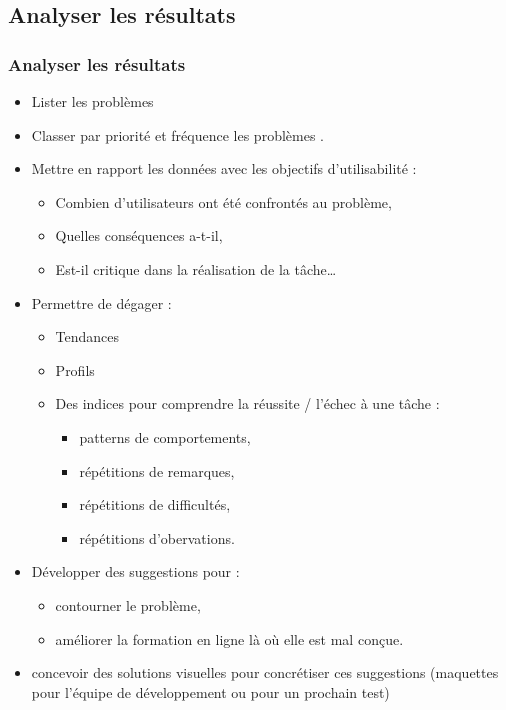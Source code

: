 	\subsection{Analyser les résultats} 
		\begin{frame}[allowframebreaks]
		\frametitle{Analyser les résultats}
			\begin {itemize}
				      \item Lister les problèmes 
				      \item Classer par priorité et fréquence les problèmes . 
				      \item Mettre en rapport les données avec les objectifs d'utilisabilité : 
				      		\begin {itemize}
				      		\item Combien d'utilisateurs ont été confrontés au problème, 
				      		\item Quelles conséquences a-t-il, 
				      		\item Est-il critique dans la réalisation de la tâche…
				      		\end{itemize}
				  	\item Permettre de dégager : 
				  		\begin {itemize}
				      		\item Tendances
				      		\item Profils
				      		\item Des indices pour comprendre la réussite / l'échec à une tâche :
				      			\begin {itemize}
				      			\item patterns de comportements,
				      			\item répétitions de remarques,
				      			\item répétitions de difficultés,
				      			\item répétitions d'obervations.
				      			\end{itemize}
						\end{itemize}
				      		\item Développer des suggestions pour :
				      			\begin {itemize}
				      			\item contourner le problème, 
				      			\item améliorer la formation en ligne là où elle est mal conçue.
				      			\end{itemize}
						\item concevoir des solutions visuelles pour concrétiser ces suggestions (maquettes pour l'équipe de développement ou pour un prochain test) 
				      		
				\end{itemize}
		\end{frame}    	

